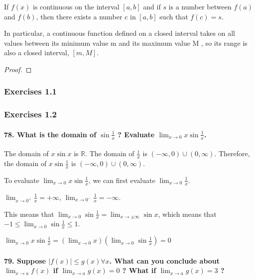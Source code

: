 \begin{theorem}
	If $f(x)$ is continuous on the interval $[a, b]$ and if $s$ is a number between $f(a)$ and $f(b)$, then there exists a number c in $[a, b]$ such that $f(c) = s$.
	
	In particular, a continuous function defined on a closed interval takes on all values between its minimum value m and its maximum value M , so its range is also a closed interval, $[m, M]$.
\end{theorem}

\begin{proof}
	
\end{proof}

\newpage

\subsubsection{Exercises 1.1}
\subsubsection{Exercises 1.2}

\paragraph{78. What is the domain of $\sin \frac{1}{x}$ ? Evaluate $\lim_{x\rightarrow 0} x\sin \frac{1}{x}$.}

The domain of $x\sin x$ is $\mathbb{R}$. The domain of $\frac{1}{x}$ is $(-\infty, 0)\cup(0, \infty)$. Therefore, the domain of $x\sin \frac{1}{x}$ is $(-\infty, 0)\cup(0, \infty)$.

To evaluate $\lim_{x\rightarrow 0} x\sin \frac{1}{x}$, we can first evaluate $\lim_{x\rightarrow 0} \frac{1}{x}$. 

$\lim_{x\rightarrow 0^+} \frac{1}{x} = +\infty$, $\lim_{x\rightarrow 0^-} \frac{1}{x} = -\infty$. 

This means that $\lim_{x\rightarrow 0} \sin \frac{1}{x} = \lim_{x\rightarrow \pm\infty} \sin x$, which means that $-1 \leq \lim_{x\rightarrow 0} \sin \frac{1}{x} \leq 1$.

$\lim_{x\rightarrow 0} x\sin \frac{1}{x} = (\lim_{x\rightarrow 0} x)(\lim_{x\rightarrow 0} \sin \frac{1}{x}) = 0$ 

\paragraph{79. Suppose $|f(x)| \leq g(x) \forall x$. What can you conclude about $\lim_{x\rightarrow a} f(x)$ if $\lim_{x\rightarrow a} g(x) = 0$ ? What if $\lim_{x\rightarrow a} g(x) = 3$ ?}

